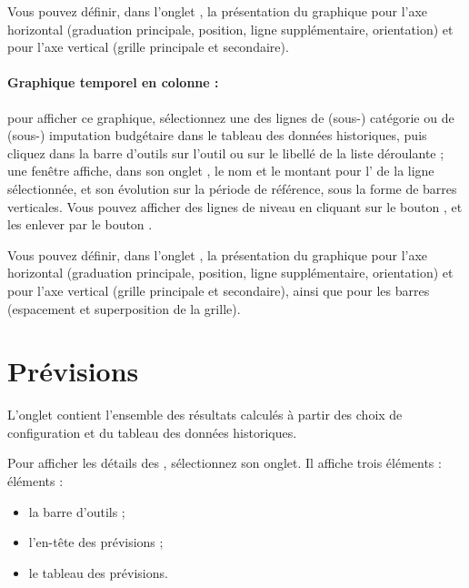 Vous pouvez définir, dans l'onglet , la présentation du graphique pour l'axe horizontal (graduation principale, position, ligne supplémentaire, orientation) et pour l'axe vertical (grille principale et secondaire). 

\paragraph{Graphique temporel en colonne :} pour afficher ce graphique, sélectionnez une des lignes de (sous-) catégorie ou de (sous-) imputation budgétaire dans le tableau des données historiques, puis cliquez dans la barre d'outils sur l'outil  ou sur le libellé  de la liste déroulante ; une fenêtre affiche, dans son onglet , le nom et le montant pour l' de la ligne sélectionnée, et son évolution sur la période de référence, sous la forme de barres verticales. Vous pouvez afficher des lignes de niveau en cliquant sur le bouton , et les enlever par le bouton .

Vous pouvez définir, dans l'onglet , la présentation du graphique pour l'axe horizontal (graduation principale, position, ligne supplémentaire, orientation) et pour l'axe vertical (grille principale et secondaire), ainsi que pour les barres (espacement et superposition de la grille).


\section{Prévisions\label{budget-estimate}}


L'onglet  contient l'ensemble des résultats calculés à partir des choix de configuration et du tableau des données historiques.

Pour afficher les détails des , sélectionnez son onglet. Il affiche trois \ifIllustration éléments :
\else éléments : 
\fi

\begin{itemize}
	\item la barre d'outils ;
	\item l'en-tête des prévisions ; 
	\item le tableau des prévisions.
\end{itemize}

